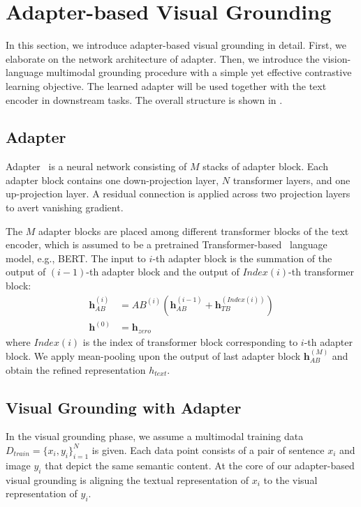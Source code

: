 
\section{Adapter-based Visual Grounding}
In this section, we introduce adapter-based visual grounding in detail. First, we elaborate on the network architecture of adapter. Then, we introduce the vision-language multimodal grounding procedure with a simple yet effective contrastive learning objective. The learned adapter will be used together with the text encoder in downstream tasks. The overall structure is shown in .

\subsection{Adapter}
\label{sec:adapter}
Adapter~\citep{kadapter} is a neural network consisting of $M$ stacks of adapter block. Each adapter block contains one down-projection layer, $N$ transformer layers, and one up-projection layer. A residual connection is applied across two projection layers to avert vanishing gradient.

The $M$ adapter blocks are placed among different transformer blocks of the text encoder, which is assumed to be a pretrained Transformer-based~\citep{attentionIsAllYouNeed} language model, e.g., BERT. The input to $i$-th adapter block is the summation of the output of $(i-1)$-th adapter block and the output of $Index(i)$-th transformer block:
\begin{align}
	\bm{h}_{AB}^{(i)} &= AB^{(i)}(\bm{h}_{AB}^{(i-1)}+\bm{h}_{TB}^{(Index(i))}) \\
	\bm{h}^{(0)} &= \bm{h}_{zero} 
\end{align}
where $Index(i)$ is the index of transformer block corresponding to $i$-th adapter block. We apply mean-pooling upon the output of last adapter block $\bm{h}_{AB}^{(M)}$ and obtain the refined representation $h_{text}$.
\subsection{Visual Grounding with Adapter}
In the visual grounding phase, we assume a multimodal training data $D_{train}=\{x_i, y_i\}_{i=1}^{N}$ is given. Each data point consists of a pair of sentence $x_i$ and image $y_i$ that depict the same semantic content. At the core of our adapter-based visual grounding is aligning the textual representation of $x_i$ to the visual representation of $y_i$.

